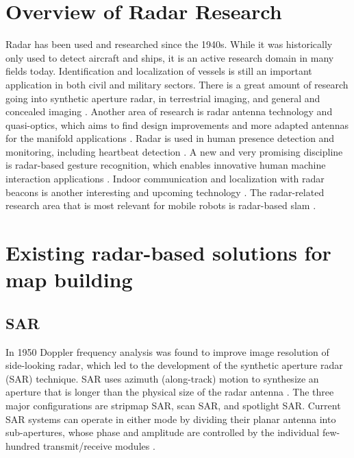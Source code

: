 \section{Overview of Radar Research}\label{overview-of-radar-research}

Radar has been used and researched since the 1940s. While it was historically only used to detect aircraft and ships, it is an active research domain in many fields today.
Identification and localization of vessels is still an important application in both civil and military sectors.
There is a great amount of research going into synthetic aperture radar, in terrestrial imaging, and general and concealed imaging \cite{Cumming2004,Axelsson2002,Bury2007,Wang2008,Sarmap.ch2009,Moreira2013,Watts2016}.
Another area of research is radar antenna technology and quasi-optics, which aims to find design improvements and more adapted antennas for the manifold applications \cite{Lu2014,Tewari2015,Gorniak2008,Vinicchayakul2016,Bisognin2014,Ernst2016a,Nordin2016,Craeye2008}.
Radar is used in human presence detection and monitoring, including heartbeat detection \cite{Valmori2016,Novak2017,Zhong2016,Mabrouk2015,Ernst2016,Molchanov2011,Sakamoto2015,Molchanov2011a,Jian2014}.
A new and very promising discipline is radar-based gesture recognition, which enables innovative human machine interaction applications \cite{Lien2016,Kim2016,Molchanov2015}.
Indoor communication and localization with radar beacons is another interesting and upcoming technology \cite{Vinicchayakul2016,Albaidhani2016,Zhong2016,Zhu2016,Segura2012,Marano2010}.
The radar-related research area that is most relevant for mobile robots is radar-based slam \cite{Adams2012,Guan2017,Rapp2016,Rouveure2008,Ristic2016,Marck2013,Deissler2010,Kauffman2014,Guerra2016,Jose2004,Jose2004a,Jose2004b,Jose2005,Gerossier2009,Mullane2010,Deissler2013,Schuster2016,Adams2013,Deissler2012,Seitz2008,Deissler2010,Deissler2009}.

\section{Existing radar-based solutions for map building}\label{existing-radar-based-solutions-for-map-building}

\subsection{SAR}\label{sar}

In 1950 Doppler frequency analysis was found to improve image resolution
of side-looking radar, which led to the development of the synthetic
aperture radar (SAR) technique. SAR uses azimuth (along-track) motion to
synthesize an aperture that is longer than the physical size of the
radar antenna \cite{Wang2008}. The three major configurations are
stripmap SAR, scan SAR, and spotlight SAR. Current SAR systems can
operate in either mode by dividing their planar antenna into
sub-apertures, whose phase and amplitude are controlled by the
individual few-hundred transmit/receive modules \cite{Moreira2013}.

